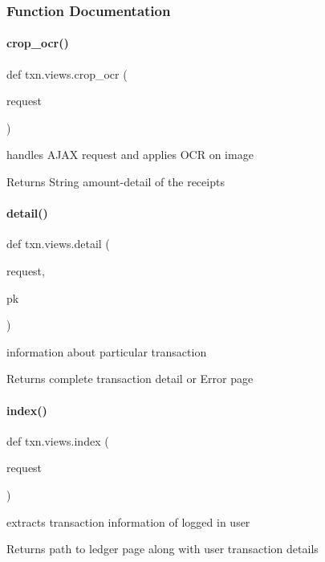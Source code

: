\subsubsection{Function Documentation}
\mbox{\label{namespacetxn_1_1views_ac1096b81d00047d1a39d206aae68158c}} 
\paragraph{\texorpdfstring{crop\+\_\+ocr()}{crop\_ocr()}}
{\footnotesize\ttfamily def txn.\+views.\+crop\+\_\+ocr (\begin{DoxyParamCaption}\item[{}]{request }\end{DoxyParamCaption})}



handles A\+J\+AX request and applies O\+CR on image 

\begin{DoxyReturn}{Returns}
String amount-\/detail of the receipts 
\end{DoxyReturn}
\mbox{\label{namespacetxn_1_1views_a8a0b2c1194c685d03b855198044c1340}} 
\paragraph{\texorpdfstring{detail()}{detail()}}
{\footnotesize\ttfamily def txn.\+views.\+detail (\begin{DoxyParamCaption}\item[{}]{request,  }\item[{}]{pk }\end{DoxyParamCaption})}



information about particular transaction 

\begin{DoxyReturn}{Returns}
complete transaction detail or Error page 
\end{DoxyReturn}
\mbox{\label{namespacetxn_1_1views_a61ce77e1acb7dff6d535eb5df692cc15}} 
\paragraph{\texorpdfstring{index()}{index()}}
{\footnotesize\ttfamily def txn.\+views.\+index (\begin{DoxyParamCaption}\item[{}]{request }\end{DoxyParamCaption})}



extracts transaction information of logged in user 

\begin{DoxyReturn}{Returns}
path to ledger page along with user transaction details 
\end{DoxyReturn}
